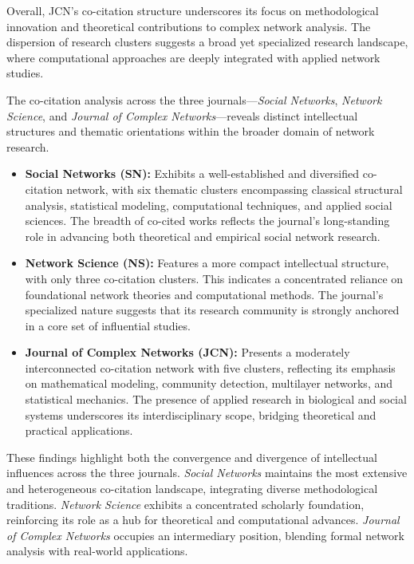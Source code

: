 \documentclass[twocolumn]{article}
\begin{document}
		Overall, JCN’s co-citation structure underscores its focus on methodological innovation and theoretical contributions to complex network analysis. The dispersion of research clusters suggests a broad yet specialized research landscape, where computational approaches are deeply integrated with applied network studies.
		
		The co-citation analysis across the three journals—\textit{Social Networks}, \textit{Network Science}, and \textit{Journal of Complex Networks}—reveals distinct intellectual structures and thematic orientations within the broader domain of network research.
		
		\begin{itemize}
			\item \textbf{Social Networks (SN):} Exhibits a well-established and diversified co-citation network, with six thematic clusters encompassing classical structural analysis, statistical modeling, computational techniques, and applied social sciences. The breadth of co-cited works reflects the journal’s long-standing role in advancing both theoretical and empirical social network research.
			
			\item \textbf{Network Science (NS):} Features a more compact intellectual structure, with only three co-citation clusters. This indicates a concentrated reliance on foundational network theories and computational methods. The journal’s specialized nature suggests that its research community is strongly anchored in a core set of influential studies.
			
			\item \textbf{Journal of Complex Networks (JCN):} Presents a moderately interconnected co-citation network with five clusters, reflecting its emphasis on mathematical modeling, community detection, multilayer networks, and statistical mechanics. The presence of applied research in biological and social systems underscores its interdisciplinary scope, bridging theoretical and practical applications.
			
		\end{itemize}
		
		These findings highlight both the convergence and divergence of intellectual influences across the three journals. \textit{Social Networks} maintains the most extensive and heterogeneous co-citation landscape, integrating diverse methodological traditions. \textit{Network Science} exhibits a concentrated scholarly foundation, reinforcing its role as a hub for theoretical and computational advances. \textit{Journal of Complex Networks} occupies an intermediary position, blending formal network analysis with real-world applications.
		
\end{document}
